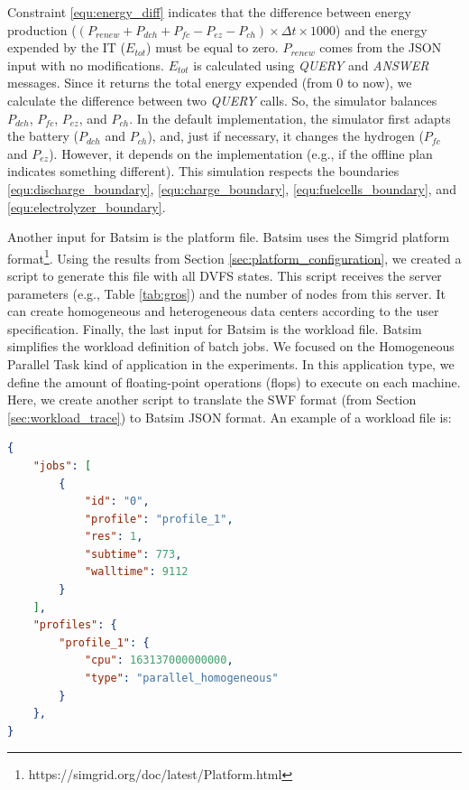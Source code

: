 Constraint \ref{equ:energy_diff} indicates that the difference between energy production ($(P_{renew} + P_{dch} + P_{fc} - P_{ez} - P_{ch}) \times \Delta t \times 1000$) and the energy expended by the IT ($E_{tot}$) must be equal to zero. $P_{renew}$ comes from the JSON input with no modifications. $E_{tot}$ is calculated using \textit{QUERY} and \textit{ANSWER} messages. Since it returns the total energy expended (from 0 to now), we calculate the difference between two \textit{QUERY} calls. So, the simulator balances $P_{dch}$,  $P_{fc}$, $P_{ez}$, and $P_{ch}$. In the default implementation, the simulator first adapts the battery ($P_{dch}$ and $P_{ch}$), and, just if necessary, it changes the hydrogen ($P_{fc}$ and $P_{ez}$).  However, it depends on the implementation (e.g., if the offline plan indicates something different). This simulation respects the boundaries \ref{equ:discharge_boundary}, \ref{equ:charge_boundary}, \ref{equ:fuelcells_boundary}, and \ref{equ:electrolyzer_boundary}.

Another input for Batsim is the platform file. Batsim uses the Simgrid platform format\footnote{https://simgrid.org/doc/latest/Platform.html}. Using the results from Section \ref{sec:platform_configuration}, we created a script to generate this file with all DVFS states. This script receives the server parameters (e.g., Table \ref{tab:gros}) and the number of nodes from this server. It can create homogeneous and heterogeneous data centers according to the user specification. Finally, the last input for Batsim is the workload file. Batsim simplifies the workload definition of batch jobs. We focused on the Homogeneous Parallel Task kind of application in the experiments. In this application type, we define the amount of floating-point operations (flops) to execute on each machine. Here, we create another script to translate the SWF format (from Section \ref{sec:workload_trace}) to Batsim JSON format. An example of a workload file is:

\begin{lstlisting}[language=json,firstnumber=1]
{
    "jobs": [
        {
            "id": "0",
            "profile": "profile_1",
            "res": 1,
            "subtime": 773,
            "walltime": 9112
        }
    ],
    "profiles": {
        "profile_1": {
            "cpu": 163137000000000,
            "type": "parallel_homogeneous"
        }
    },
}       
\end{lstlisting}

